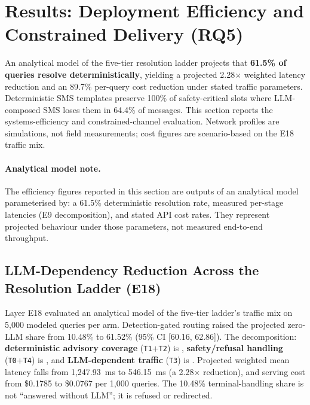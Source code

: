 
\section{Results: Deployment Efficiency and Constrained Delivery (RQ5)}
\label{sec:results_deployment}

An analytical model of the five-tier resolution ladder projects that \textbf{61.5\% of queries resolve deterministically}, yielding a projected 2.28$\times$ weighted latency reduction and an 89.7\% per-query cost reduction under stated traffic parameters. Deterministic SMS templates preserve 100\% of safety-critical slots where LLM-composed SMS loses them in 64.4\% of messages. This section reports the systems-efficiency and constrained-channel evaluation. Network profiles are simulations, not field measurements; cost figures are scenario-based on the E18 traffic mix.

\paragraph{Analytical model note.} The efficiency figures reported in this section are outputs of an analytical model parameterised by: a 61.5\% deterministic resolution rate, measured per-stage latencies (E9 decomposition), and stated API cost rates. They represent projected behaviour under those parameters, not measured end-to-end throughput.

\subsection{LLM-Dependency Reduction Across the Resolution Ladder (E18)}
Layer E18 evaluated an analytical model of the five-tier ladder's traffic mix on 5{,}000 modeled queries per arm. Detection-gated routing raised the projected zero-LLM share from 10.48\% to 61.52\% (95\% CI [60.16, 62.86]). The decomposition: \textbf{deterministic advisory coverage} (\texttt{T1}+\texttt{T2}) is \DetAdvisoryCoverage{}, \textbf{safety/refusal handling} (\texttt{T0}+\texttt{T4}) is \SafetyRefusalHandling{}, and \textbf{LLM-dependent traffic} (\texttt{T3}) is \LLMDependent{}. Projected weighted mean latency falls from 1{,}247.93~ms to 546.15~ms (a 2.28$\times$ reduction), and serving cost from \$0.1785 to \$0.0767 per 1{,}000 queries. The 10.48\% terminal-handling share is not ``answered without LLM''; it is refused or redirected.

